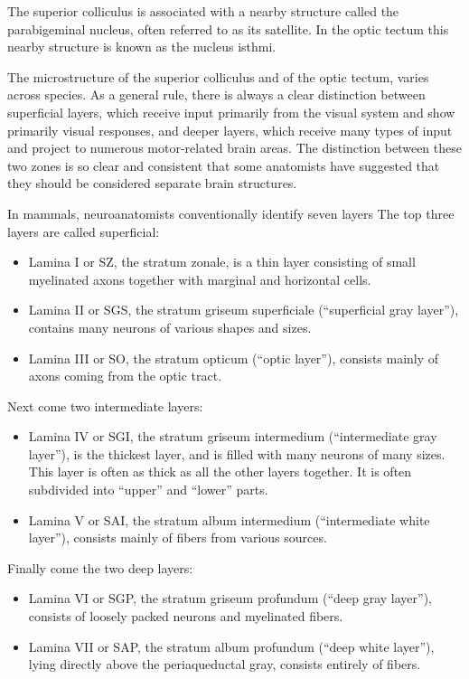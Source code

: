 The superior colliculus is associated with a nearby structure called the parabigeminal nucleus, often referred to as its satellite. In the optic tectum this nearby structure is known as the nucleus isthmi.

The microstructure of the superior colliculus and of the optic tectum, varies across species. As a general rule, there is always a clear distinction between superficial layers, which receive input primarily from the visual system and show primarily visual responses, and deeper layers, which receive many types of input and project to numerous motor-related brain areas. The distinction between these two zones is so clear and consistent that some anatomists have suggested that they should be considered separate brain structures.

In mammals, neuroanatomists conventionally identify seven layers The top three layers are called superficial:

\begin{itemize}
\tightlist
\item
  Lamina I or SZ, the stratum zonale, is a thin layer consisting of small myelinated axons together with marginal and horizontal cells.
\item
  Lamina II or SGS, the stratum griseum superficiale (``superficial gray layer''), contains many neurons of various shapes and sizes.
\item
  Lamina III or SO, the stratum opticum (``optic layer''), consists mainly of axons coming from the optic tract.
\end{itemize}

Next come two intermediate layers:

\begin{itemize}
\tightlist
\item
  Lamina IV or SGI, the stratum griseum intermedium (``intermediate gray layer''), is the thickest layer, and is filled with many neurons of many sizes. This layer is often as thick as all the other layers together. It is often subdivided into ``upper'' and ``lower'' parts.
\item
  Lamina V or SAI, the stratum album intermedium (``intermediate white layer''), consists mainly of fibers from various sources.
\end{itemize}

Finally come the two deep layers:

\begin{itemize}
\tightlist
\item
  Lamina VI or SGP, the stratum griseum profundum (``deep gray layer''), consists of loosely packed neurons and myelinated fibers.
\item
  Lamina VII or SAP, the stratum album profundum (``deep white layer''), lying directly above the periaqueductal gray, consists entirely of fibers.
\end{itemize}

